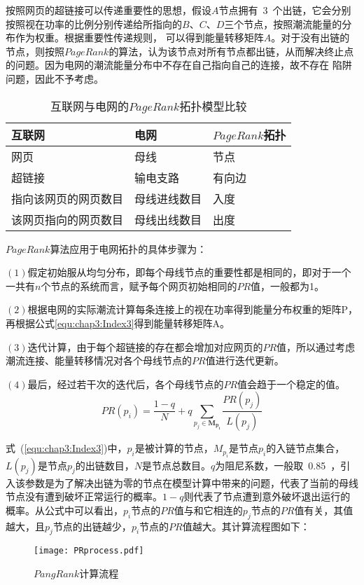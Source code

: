 按照网页的超链接可以传递重要性的思想，假设$A$节点拥有~3~个出链，它会分别按照视在功率的比例分别传递给所指向的$B$、$C$、$D$三个节点，按照潮流能量的分布作为权重。根据重要性传递规则，
可以得到能量转移矩阵$A$。对于没有出链的节点，则按照$PageRank$的算法，认为该节点对所有节点都出链，从而解决终止点的问题。因为电网的潮流能量分布中不存在自己指向自己的连接，故不存在
陷阱问题，因此不予考虑。
\begin{table}[htb]
  \centering
  \caption{互联网与电网的$PageRank$拓扑模型比较}
  \label{tab:PRComparision}
    \begin{tabular}{C{4.5cm}C{4.5cm}C{4cm}}
      \toprule
      互联网 & 电网 & $PageRank$拓扑 \\
      \midrule
      网页 & 母线 & 节点\\
      超链接 & 输电支路 & 有向边\\
      指向该网页的网页数目 & 母线进线数目 & 入度\\
      该网页指向的网页数目 & 母线出线数目 & 出度\\
      \bottomrule
    \end{tabular}
\end{table}

$PageRank$算法应用于电网拓扑的具体步骤为：

$(1)$假定初始服从均匀分布，即每个母线节点的重要性都是相同的，即对于一个一共有$n$个节点的系统而言，赋予每个网页初始相同的$PR$值，一般都为1。

$(2)$根据电网的实际潮流计算每条连接上的视在功率得到能量分布权重的矩阵P，再根据公式\ref{equ:chap3:Index3}得到能量转移矩阵A。

$(3)$迭代计算，由于每个超链接的存在都会增加对应网页的$PR$值，所以通过考虑潮流连接、能量转移情况对各个母线节点的$PR$值进行迭代更新。

$(4)$最后，经过若干次的迭代后，各个母线节点的$PR$值会趋于一个稳定的值。
\begin{equation}
\label{equ:chap3:Index3}
PR(p_i)=\frac{1-q}{N}+q\sum\limits_{p_j\in\mathbf{M_{p_i}}}{\frac{PR(p_j)}{L(p_j)}}
\end{equation}

式~(\ref{equ:chap3:Index3})中，$p_i$是被计算的节点，$M_{p_i}$是节点$p_i$的入链节点集合，$L(p_j)$是节点$p_j$的出链数目，$N$是节点总数目。$q$为阻尼系数，一般取~0.85~，引入该参数是为了解决出链为零的节点在模型计算中带来的问题，代表了当前的母线节点没有遭到破坏正常运行的概率。$1-q$则代表了节点遭到意外破坏退出运行的概率。从公式中可以看出，$p_i$节点的$PR$值与和它相连的$p_j$节点的$PR$值有关，其值越大，且$p_j$节点的出链越少，$p_i$节点的$PR$值越大。其计算流程图如下：
\begin{figure}[H] %
  \centering
  \texttt{[image: PRprocess.pdf]}
  \caption{$PangRank$计算流程}
  \label{fig:PRPro}
\end{figure}

